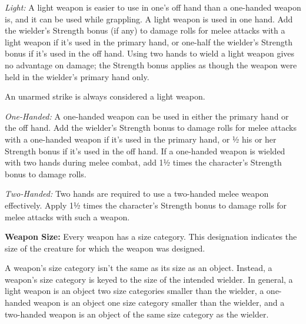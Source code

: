\textit{Light:} A light weapon is easier to use in one's off hand than a one-handed weapon is, and it can be used while grappling. A light weapon is used in one hand. Add the wielder's Strength bonus (if any) to damage rolls for melee attacks with a light weapon if it's used in the primary hand, or one-half the wielder's Strength bonus if it's used in the off hand. Using two hands to wield a light weapon gives no advantage on damage; the Strength bonus applies as though the weapon were held in the wielder's primary hand only.

An unarmed strike is always considered a light weapon.

\textit{One-Handed:} A one-handed weapon can be used in either the primary hand or the off hand. Add the wielder's Strength bonus to damage rolls for melee attacks with a one-handed weapon if it's used in the primary hand, or ½ his or her Strength bonus if it's used in the off hand. If a one-handed weapon is wielded with two hands during melee combat, add 1½ times the character's Strength bonus to damage rolls.

\textit{Two-Handed:} Two hands are required to use a two-handed melee weapon effectively. Apply 1½ times the character's Strength bonus to damage rolls for melee attacks with such a weapon.

\textbf{Weapon Size:} Every weapon has a size category. This designation indicates the size of the creature for which the weapon was designed.


A weapon's size category isn't the same as its size as an object. Instead, a weapon's size category is keyed to the size of the intended wielder. In general, a light weapon is an object two size categories smaller than the wielder, a one-handed weapon is an object one size category smaller than the wielder, and a two-handed weapon is an object of the same size category as the wielder.


